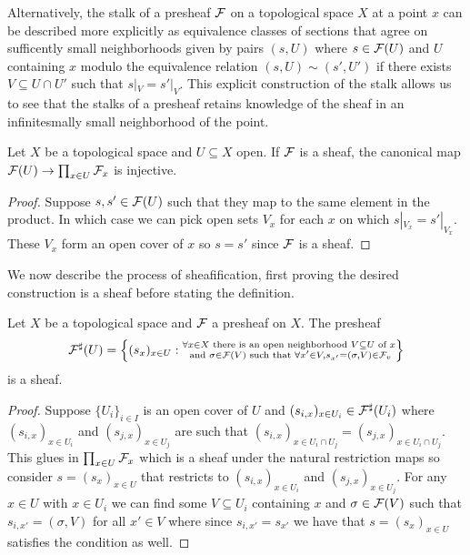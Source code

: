 Alternatively, the stalk of a presheaf $\mathcal{F}$ on a topological space $X$ at a point $x$ can be described more explicitly as equivalence classes of sections that agree on sufficently small neighborhoods given by pairs $(s,U)$ where $s\in\mathcal{F}(U)$ and $U$ containing $x$ modulo the equivalence relation $(s,U)\sim(s',U')$ if there exists $V\subseteq U\cap U'$ such that $s|_{V}=s'|_{V}$. This explicit construction of the stalk allows us to see that the stalks of a presheaf retains knowledge of the sheaf in an infinitesmally small neighborhood of the point. 
\begin{lemma}\label{lem: map to stalks is injective}
    Let $X$ be a topological space and $U\subseteq X$ open. If $\mathcal{F}$ is a sheaf, the canonical map $\mathcal{F}(U)\to\prod_{x\in U}\mathcal{F}_{x}$ is injective. 
\end{lemma}
\begin{proof}
    Suppose $s,s'\in\mathcal{F}(U)$ such that they map to the same element in the product. In which case we can pick open sets $V_{x}$ for each $x$ on which $s|_{V_{x}}=s'|_{V_{x}}$. These $V_{x}$ form an open cover of $x$ so $s=s'$ since $\mathcal{F}$ is a sheaf. 
\end{proof}
We now describe the process of sheafification, first proving the desired construction is a sheaf before stating the definition. 
\begin{proposition}\label{prop: sheafification is a sheaf}
    Let $X$ be a topological space and $\mathcal{F}$ a presheaf on $X$. The presheaf 
    $$\mathcal{F}^{\sharp}(U)=\left\{(s_{x})_{x\in U}:\substack{\forall x\in X \text{ there is an open neighborhood }V\subseteq U\text{ of }x \\ \text{ and }\sigma\in\mathcal{F}(V)\text{ such that }\forall x'\in V, s_{x'}=(\sigma,V)\in\mathcal{F}_{v}}\right\}$$
    is a sheaf. 
\end{proposition}
\begin{proof}
    Suppose $\{U_{i}\}_{i\in I}$ is an open cover of $U$ and $(s_{i,x})_{x\in U_{i}}\in\mathcal{F}^{\sharp}(U_{i})$ where $(s_{i,x})_{x\in U_{i}}$ and $(s_{j,x})_{x\in U_{j}}$ are such that $(s_{i,x})_{x\in U_{i}\cap U_{j}} = (s_{j,x})_{x\in U_{i}\cap U_{j}}$. This glues in $\prod_{x\in U}\mathcal{F}_{x}$ which is a sheaf under the natural restriction maps so consider $s=(s_{x})_{x\in U}$ that restricts to $(s_{i,x})_{x\in U_{i}}$ and $(s_{j,x})_{x\in U_{j}}$. For any $x\in U$ with $x\in U_{i}$ we can find some $V\subseteq U_{i}$ containing $x$ and $\sigma\in\mathcal{F}(V)$ such that $s_{i,x'}=(\sigma,V)$ for all $x'\in V$ where since $s_{i,x'}=s_{x'}$ we have that $s=(s_{x})_{x\in U}$ satisfies the condition as well. 
\end{proof}
